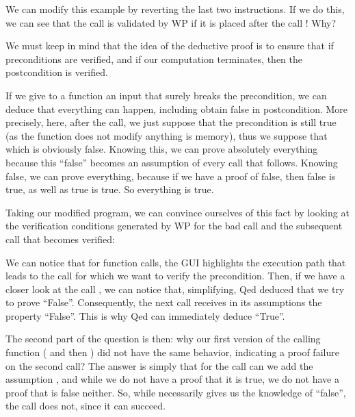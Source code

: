 

We can modify this example by reverting the last two instructions. If we
do this, we can see that the call  is validated by WP if
it is placed after the call ! Why?



We must keep in mind that the idea of the deductive proof is to ensure
that if preconditions are verified, and if our computation terminates,
then the postcondition is verified.



If we give to a function an input that surely breaks the precondition, we can
deduce that everything can happen, including obtain false in postcondition.
More precisely, here, after the call, we just suppose that the precondition
is still true (as the function does not modify anything is memory), thus we
suppose that  which is obviously false.
Knowing this, we can prove absolutely everything because this ``false'' becomes
an assumption of every call that follows. Knowing false, we can prove everything,
because if we have a proof of false, then false is true, as well as true is true.
So everything is true.



Taking our modified program, we can convince ourselves of this fact by
looking at the verification conditions generated by WP for the bad call and the
subsequent call that becomes verified:







We can notice that for function calls, the GUI highlights the execution
path that leads to the call for which we want to verify the precondition.
Then, if we have a closer look at the call , we
can notice that, simplifying, Qed deduced that we try to prove
``False''. Consequently, the next call  receives in its
assumptions the property ``False''. This is why Qed can immediately
deduce ``True''.



The second part of the question is then: why our first version of the
calling function ( and then ) did
not have the same behavior, indicating a proof failure on the second
call? The answer is simply that for the call  can we add
the assumption , and while we do not have a proof
that it is true, we do not have a proof that is false neither. So, while
 necessarily gives us the knowledge of ``false'',
the call  does not, since it can succeed.


